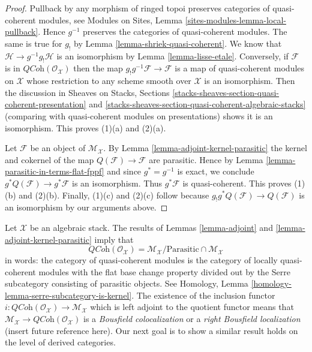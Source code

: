 \begin{proof}
Pullback by any morphism of ringed topoi preserves categories of quasi-coherent
modules, see
Modules on Sites, Lemma \ref{sites-modules-lemma-local-pullback}.
Hence $g^{-1}$ preserves the categories of quasi-coherent modules.
The same is true for $g_!$ by
Lemma \ref{lemma-shriek-quasi-coherent}.
We know that $\mathcal{H} \to g^{-1}g_!\mathcal{H}$ is an isomorphism by
Lemma \ref{lemma-lisse-etale}.
Conversely, if $\mathcal{F}$ is in $\textit{QCoh}(\mathcal{O}_\mathcal{X})$
then the map $g_!g^{-1}\mathcal{F} \to \mathcal{F}$ is a map of quasi-coherent
modules on $\mathcal{X}$ whose restriction to any scheme smooth over
$\mathcal{X}$ is an isomorphism. Then the discussion in
Sheaves on Stacks, Sections
\ref{stacks-sheaves-section-quasi-coherent-presentation} and
\ref{stacks-sheaves-section-quasi-coherent-algebraic-stacks}
(comparing with quasi-coherent modules on presentations)
shows it is an isomorphism. This proves (1)(a) and (2)(a).

\medskip\noindent
Let $\mathcal{F}$ be an object of $\mathcal{M}_\mathcal{X}$. By
Lemma \ref{lemma-adjoint-kernel-parasitic}
the kernel and cokernel of the map
$Q(\mathcal{F}) \to \mathcal{F}$ are parasitic. Hence by
Lemma \ref{lemma-parasitic-in-terms-flat-fppf}
and since $g^* = g^{-1}$ is exact, we conclude
$g^*Q(\mathcal{F}) \to g^*\mathcal{F}$ is an isomorphism. Thus
$g^*\mathcal{F}$ is quasi-coherent. This proves (1)(b) and (2)(b).
Finally, (1)(c) and (2)(c) follow because
$g_!g^*Q(\mathcal{F}) \to Q(\mathcal{F})$ is an isomorphism by
our arguments above.
\end{proof}

\begin{remark}
\label{remark-bousfield-colocalization}
Let $\mathcal{X}$ be an algebraic stack. The results of
Lemmas \ref{lemma-adjoint} and \ref{lemma-adjoint-kernel-parasitic}
imply that
$$
\textit{QCoh}(\mathcal{O}_\mathcal{X}) =
\mathcal{M}_\mathcal{X} / \text{Parasitic} \cap \mathcal{M}_\mathcal{X}
$$
in words: the category of quasi-coherent modules is the category
of locally quasi-coherent modules with the flat base change property
divided out by the Serre subcategory consisting of parasitic objects.
See Homology, Lemma \ref{homology-lemma-serre-subcategory-is-kernel}.
The existence of the inclusion functor
$i : \textit{QCoh}(\mathcal{O}_\mathcal{X}) \to \mathcal{M}_\mathcal{X}$
which is left adjoint to the quotient functor means that
$\mathcal{M}_\mathcal{X} \to \textit{QCoh}(\mathcal{O}_\mathcal{X})$
is a {\it Bousfield colocalization} or a {\it right Bousfield localization}
(insert future reference here). Our next goal is to show a similar result
holds on the level of derived categories.
\end{remark}

